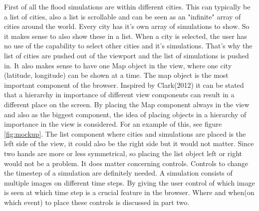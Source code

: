 First of all the flood simulations are within different cities. This can typically be a list of cities, also a list is scrollable and can be seen as an "infinite" array of cities around the world. Every city has it's own array of simulations to show. So it makes sense to also show these in a list. When a city is selected, the user has no use of the capability to select other cities and it's simulations. That's why the list of cities are pushed out of the viewport and the list of simulations is pushed in. 
It also makes sense to have one Map object in the view, where one city (latitude, longitude) can be shown at a time. The map object is the most important component of the browser. Inspired by Clark(2012) it can be stated that a hierarchy in importance of different view components can result in a different place on the screen. By placing the Map component always in the view and also as the biggest component, the idea of placing objects in a hierarchy of importance in the view is considered. For an example of this, see figure \ref{fig:mockup}.
The list component where cities and simulations are placed is the left side of the view, it could also be the right side but it would not matter. Since two hands are more or less symmetrical, so placing the list object left or right would not be a problem. It does matter concerning controls. Controls to change the timestep of a simulation are definitely needed. A simulation consists of multiple images on different time steps. By giving the user control of which image is seen at which time step is a crucial feature in the browser. Where and when(on which event) to place these controls is discussed in part two.
